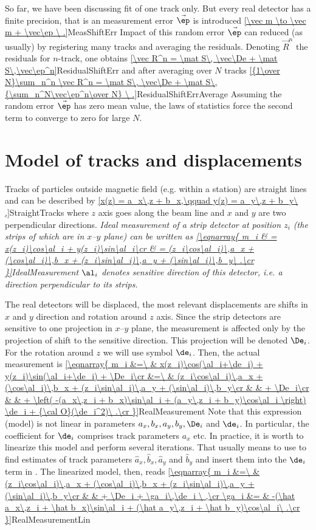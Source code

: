 So far, we have been discussing fit of one track only. But every real detector has a finite precision, that is an measurement error $\vec\ep$ is introduced
\eqref{\vec m \to \vec m + \vec\ep \ .}{MeasShiftErr}
Impact of this random error $\vec\ep$ can reduced (as usually) by registering many tracks and averaging the residuals. Denoting $\vec R^n$ the residuals for $n$-track, one obtains
\eqref{\vec R^n = \mat S\, \vec\De + \mat S\,\vec\ep^n}{ResidualShiftErr}
and after averaging over $N$ tracks
\eqref{{1\over N}\sum_n^n \vec R^n = \mat S\, \vec\De + \mat S\,{\sum_n^N\vec\ep^n\over N} \ .}{ResidualShiftErrAverage}
Assuming the random error $\vec\ep$ has zero mean value, the laws of statistics force the second term to converge to zero for large $N$.

\section[track model]{Model of tracks and displacements}

Tracks of particles outside magnetic field (e.g. within a station) are straight lines and can be described by
\eqref{x(z) = a_x\,z + b_x,\qquad y(z) = a_y\,z + b_y\ ,}{StraightTracks}
where $z$ axis goes along the beam line and $x$ and $y$ are two perpendicular directions. \em{Ideal} measurement of a strip detector at position $z_i$ (the strips of which are in $x$--$y$ plane) can be written as
\eqref{\eqnarray{
m_i & = x(z_i)\cos\al_i + y(z_i)\sin\al_i\cr
	& = (z_i\cos\al_i)\,a_x + (\cos\al_i)\,b_x + (z_i\sin\al_i)\,a_y + (\sin\al_i)\,b_y\ .\cr
}}{IdealMeasurement}
$\al_i$ denotes sensitive direction of this detector, i.e. a direction perpendicular to its strips.

The real detectors will be displaced, the most relevant displacements are shifts in $x$ and $y$ direction and rotation around $z$ axis. Since the strip detectors are sensitive to one projection in $x$--$y$ plane, the measurement is affected only by the projection of shift to the sensitive direction. This projection will be denoted $\De_i$. For the rotation around $z$ we will use symbol $\de_i$. Then, the actual measurement is
\eqref{\eqnarray{
m_i &=\ & x(z_i)\cos(\al_i+\de_i) + y(z_i)\sin(\al_i+\de_i) + \De_i\cr
	&=\ & (z_i\cos\al_i)\,a_x + (\cos\al_i)\,b_x + (z_i\sin\al_i)\,a_y + (\sin\al_i)\,b_y\cr
	&	& + \De_i\cr
	&	& + \left( -(a_x\,z_i + b_x)\sin\al_i + (a_y\,z_i + b_y)\cos\al_i \right) \de_i + {\cal O}(\de_i^2)\ .\cr
}}{RealMeasurement}
Note that this expression (model) is not linear in parameters $a_x, b_x, a_y, b_y, \De_i$ and $\de_i$. In particular, the coefficient for $\de_i$ comprises track parameters $a_x$ etc. In practice, it is worth to linearize this model and perform several iterations. That usually means to use  to find estimates of track parameters $\hat a_x, \hat b_x, \hat a_y$ and $\hat b_y$ and insert them into the $\de_i$ term in . The linearized model, then, reads
\eqref{\eqnarray{
m_i		&=\ & (z_i\cos\al_i)\,a_x + (\cos\al_i)\,b_x + (z_i\sin\al_i)\,a_y + (\sin\al_i)\,b_y\cr
		&	& + \De_i + \ga_i\,\de_i \ ,\cr
\ga_i	&=	& -(\hat a_x\,z_i + \hat b_x)\sin\al_i + (\hat a_y\,z_i + \hat b_y)\cos\al_i\ .\cr
}}{RealMeasurementLin}

